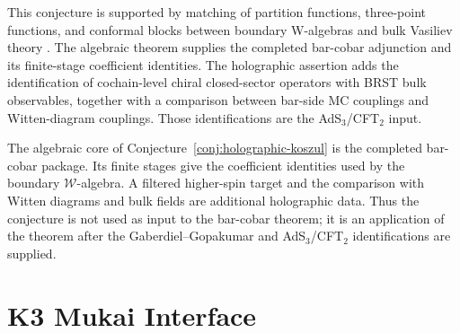\begin{remark}
This conjecture is supported by matching of partition functions,
three-point functions, and conformal blocks between boundary W-algebras
and bulk Vasiliev theory \cite{GG11}. The algebraic theorem supplies
the completed bar-cobar adjunction and its finite-stage coefficient
identities. The holographic assertion adds the identification of
cochain-level chiral closed-sector operators with BRST bulk observables, together
with a comparison between bar-side MC couplings and Witten-diagram
couplings. Those identifications are the AdS$_3$/CFT$_2$ input.
\end{remark}

\begin{remark}
The algebraic core of Conjecture~\ref{conj:holographic-koszul} is the
completed bar-cobar package. Its finite stages give the coefficient
identities used by the boundary $\mathcal W$-algebra.  A filtered
higher-spin target and the comparison with Witten diagrams and bulk
fields are additional holographic data. Thus the conjecture is not
used as input to the bar-cobar theorem; it is an application of the
theorem after the Gaberdiel--Gopakumar and AdS$_3$/CFT$_2$
identifications are supplied.
\end{remark}

\section{K3 Mukai Interface}
\label{sec:pdq-supplement}


